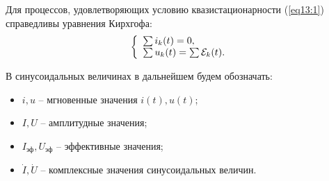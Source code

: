 	Для процессов, удовлетворяющих условию квазистационарности (\ref{eq13:1})
    справедливы уравнения Кирхгофа:
	\[ \left\{
	\begin{array}{l}
        \sum i_k(t) = 0, \\
		\sum u_k(t) = \sum\mathcal{E}_k(t).
	\end{array} \right.
	\]
	
	\begin{remark}
        В синусоидальных величинах в дальнейшем будем обозначать:
        \begin{itemize}
            \item \( i, u \) -- мгновенные значения \( i(t), u(t) \);
            \item \( I, U \) -- амплитудные значения;
            \item \( I_{\textit{эф}}, U_{\textit{эф}} \) -- эффективные
                значения;
            \item \( \dot{I}, \dot{U} \) -- комплексные значения синусоидальных
                величин.
        \end{itemize}
	\end{remark}
	
